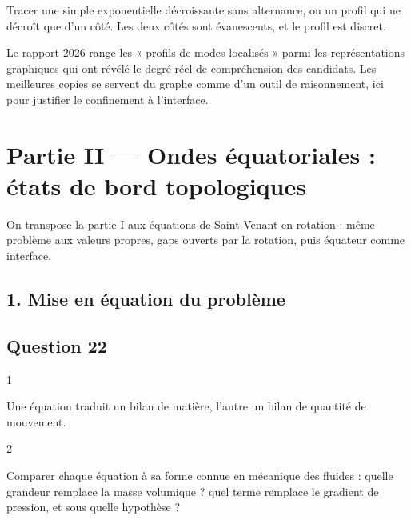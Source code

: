 \documentclass[11pt,a4paper]{article}
\begin{document}
\begin{piege}

Tracer une simple exponentielle décroissante sans alternance, ou un profil qui ne décroît que d'un côté. Les deux côtés sont évanescents, et le profil est discret.

\end{piege}

\begin{jury}

Le rapport 2026 range les « profils de modes localisés » parmi les représentations graphiques qui ont révélé le degré réel de compréhension des candidats. Les meilleures copies se servent du graphe comme d'un outil de raisonnement, ici pour justifier le confinement à l'interface.

\end{jury}

\hypertarget{partie-ii-ondes-uxe9quatoriales-uxe9tats-de-bord-topologiques}{%
\section{Partie II --- Ondes équatoriales : états de bord topologiques}\label{partie-ii-ondes-uxe9quatoriales-uxe9tats-de-bord-topologiques}}

On transpose la partie I aux équations de Saint-Venant en rotation : même problème aux valeurs propres, gaps ouverts par la rotation, puis équateur comme interface.

\hypertarget{mise-en-uxe9quation-du-probluxe8me}{%
\subsection{1. Mise en équation du problème}\label{mise-en-uxe9quation-du-probluxe8me}}

\hypertarget{question-22}{%
\subsection{Question 22}\label{question-22}}

\begin{indication}{1}

Une équation traduit un bilan de matière, l'autre un bilan de quantité de mouvement.

\end{indication}

\begin{indication}{2}

Comparer chaque équation à sa forme connue en mécanique des fluides : quelle grandeur remplace la masse volumique ? quel terme remplace le gradient de pression, et sous quelle hypothèse ?

\end{indication}
\end{document}
